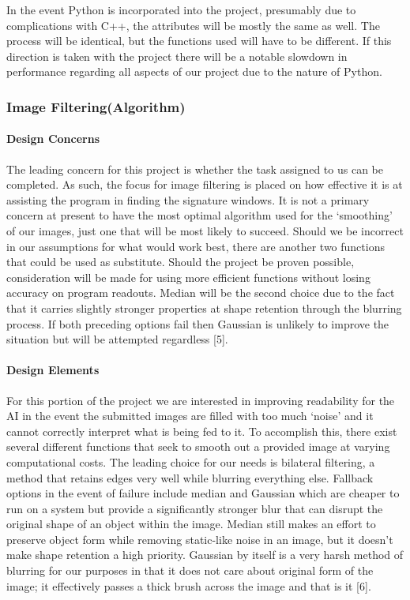 \documentclass[article, onecolumn, draftclsnofoot,10pt, compsoc]{IEEEtran}
\begin{document}
In the event Python is incorporated into the project, presumably due to complications with C++, the attributes will be mostly the same as well. The process will be identical, but the functions used will have to be different. If this direction is taken with the project there will be a notable slowdown in performance regarding all aspects of our project due to the nature of Python.

\subsubsection{Image Filtering(Algorithm)}
\paragraph{Design Concerns}
The leading concern for this project is whether the task assigned to us can be completed. As such, the focus for image filtering is placed on how effective it is at assisting the program in finding the signature windows. It is not a primary concern at present to have the most optimal algorithm used for the ‘smoothing’ of our images, just one that will be most likely to succeed. Should we be incorrect in our assumptions for what would work best, there are another two functions that could be used as substitute. Should the project be proven possible, consideration will be made for using more efficient functions without losing accuracy on program readouts. Median will be the second choice due to the fact that it carries slightly stronger properties at shape retention through the blurring process. If both preceding options fail then Gaussian is unlikely to improve the situation but will be attempted regardless [5].

\paragraph{Design Elements}
For this portion of the project we are interested in improving readability for the AI in the event the submitted images are filled with too much ‘noise’ and it cannot correctly interpret what is being fed to it. To accomplish this, there exist several different functions that seek to smooth out a provided image at varying computational costs. The leading choice for our needs is bilateral filtering, a method that retains edges very well while blurring everything else. Fallback options in the event of failure include median and Gaussian which are cheaper to run on a system but provide a significantly stronger blur that can disrupt the original shape of an object within the image. Median still makes an effort to preserve object form while removing static-like noise in an image, but it doesn’t make shape retention a high priority. Gaussian by itself is a very harsh method of blurring for our purposes in that it does not care about original form of the image; it effectively passes a thick brush across the image and that is it [6].
\end{document}

